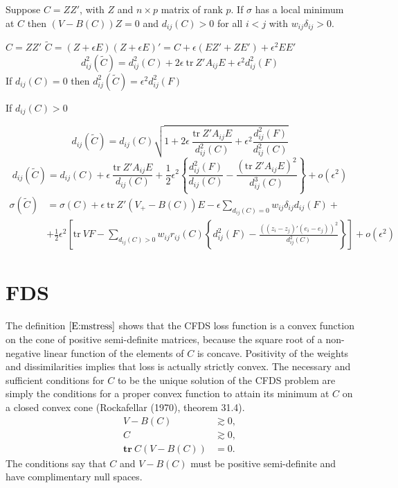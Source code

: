 \documentclass[
  12pt,
]{article}
\begin{document}
Suppose \(C=ZZ'\), with \(Z\) and \(n\times p\) matrix of rank \(p\). If
\(\sigma\) has a local minimum at \(C\) then \((V-B(C))Z=0\) and
\(d_{ij}(C)>0\) for all \(i<j\) with \(w_{ij}\delta_{ij}>0\).

\(C=ZZ'\)
\(\tilde C=(Z+\epsilon E)(Z+\epsilon E)'=C+\epsilon(EZ'+ZE')+\epsilon^2 EE'\)
\[
d_{ij}^2(\tilde C)=d_{ij}^2(C)+2\epsilon\ \text{tr}\ Z'A_{ij}E+\epsilon^2d_{ij}^2(F)
\] If \(d_{ij}(C)=0\) then \(d_{ij}^2(\tilde C)=\epsilon^2d_{ij}^2(F)\)

If \(d_{ij}(C)>0\)

\[
d_{ij}(\tilde C)=d_{ij}(C)\sqrt{1+2\epsilon\ \frac{\text{tr}\ Z'A_{ij}E}{d_{ij}^2(C)}+\epsilon^2\frac{d_{ij}^2(F)}{d_{ij}^2(C)}}
\] \[
d_{ij}(\tilde C)=d_{ij}(C)+\epsilon\ \frac{\text{tr}\ Z'A_{ij}E}{d_{ij}(C)}+\frac12\epsilon^2\left\{\frac{d_{ij}^2(F)}{d_{ij}(C)}-\frac{(\text{tr}\ Z'A_{ij}E)^2}{d_{ij}^3(C)}\right\}+o(\epsilon^2)
\] \begin{align*}
\sigma(\tilde C)&=\sigma(C)+\epsilon\ \text{tr}\ Z'(V_+-B(C))E-\epsilon\mathop{\sum}_{d_{ij}(C)=0}w_{ij}\delta_{ij}d_{ij}(F)+\\
&+\frac12\epsilon^2\left[\text{tr}\ VF-\mathop{\sum}_{d_{ij}(C)>0}w_{ij}r_{ij}(C)\left\{d_{ij}^2(F)-\frac{((z_i-z_j)'(e_i-e_j))^2}{d_{ij}^2(C)}\right\}\right]+o(\epsilon^2)
\end{align*}

\hypertarget{fds}{%
\section{FDS}\label{fds}}

The definition \(\eqref{E:mstress}\) shows that the CFDS loss function
is a convex function on the cone of positive semi-definite matrices,
because the square root of a non-negative linear function of the
elements of \(C\) is concave. Positivity of the weights and
dissimilarities implies that loss is actually strictly convex. The
necessary and sufficient conditions for \(C\) to be the unique solution
of the CFDS problem are simply the conditions for a proper convex
function to attain its minimum at \(C\) on a closed convex cone
(Rockafellar (1970), theorem 31.4). \begin{align*}
V-B(C)&\gtrsim 0,\\
C&\gtrsim 0,\\
\mathbf{tr}\ C(V-B(C))&=0.
\end{align*} The conditions say that \(C\) and \(V-B(C)\) must be
positive semi-definite and have complimentary null spaces.
\end{document}
